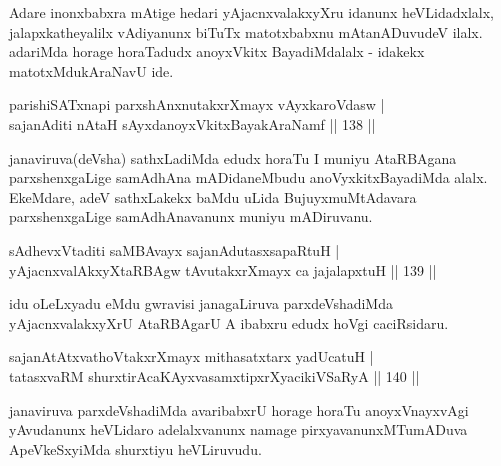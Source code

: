 \begin{artha}
Adare inonxbabxra mAtige hedari yAjacnxvalakxyXru idanunx heVLidadxlalx, jalapxkatheyalilx vAdiyanunx biTuTx matotxbabxnu mAtanADuvudeV ilalx. adariMda horage horaTadudx anoyxVkitx BayadiMdalalx - idakekx matotxMdukAraNavU ide.
\end{artha}

\begin{shl}
parishiSATxnapi parxshAnxnutakxrXmayx vAyxkaroVdasw |\\
sajanAditi nAtaH sAyxdanoyxVkitxBayakAraNamf \hfill || 138 ||
\end{shl}

\begin{artha}
janaviruva(deVsha) sathxLadiMda edudx horaTu I muniyu AtaRBAgana parxshenxgaLige samAdhAna mADidaneMbudu anoVyxkitxBayadiMda alalx. EkeMdare, adeV sathxLakekx baMdu uLida BujuyxmuMtAdavara parxshenxgaLige samAdhAnavanunx muniyu mADiruvanu.
\end{artha}


\begin{shl}
sAdhevxVtaditi saMBAvayx sajanAdutasxsapaRtuH |\\
yAjacnxvalAkxyXtaRBAgw tAvutakxrXmayx ca jajalapxtuH \hfill || 139 ||
\end{shl}

\begin{artha}
idu oLeLxyadu eMdu gwravisi janagaLiruva parxdeVshadiMda yAjacnxvalakxyXrU AtaRBAgarU A ibabxru edudx hoVgi caciRsidaru.
\end{artha}


\begin{shl}
sajanAtAtxvathoVtakxrXmayx mithasatxtarx yadUcatuH |\\
tatasxvaRM shurxtirAcaKAyxvasamxtipxrXyacikiVSaRyA \hfill || 140 ||
\end{shl}

\begin{artha}
janaviruva parxdeVshadiMda avaribabxrU horage horaTu anoyxVnayxvAgi yAvudanunx heVLidaro 
adelalxvanunx namage pirxyavanunxMTumADuva ApeVkeSxyiMda  shurxtiyu heVLiruvudu.
\end{artha}



